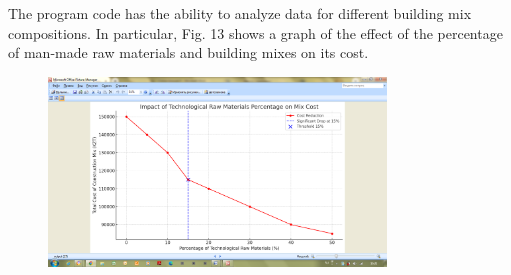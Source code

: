 {%

The program code has the ability to analyze data for different building
mix compositions. In particular, Fig. 13 shows a graph of the effect of
the percentage of man-made raw materials and building mixes on its cost.

\begin{figure}[H]
	\centering
	\includegraphics[width=0.8\textwidth]{media/ict3/image14}
	\caption*{}
\end{figure}


}
